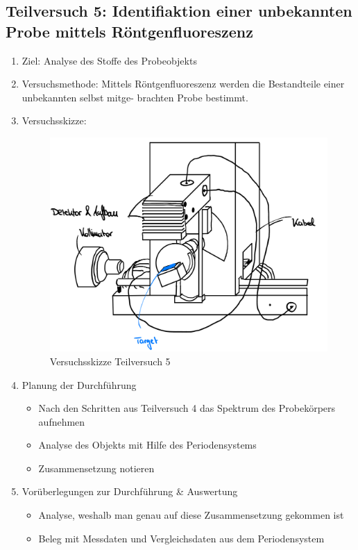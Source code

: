 \documentclass{article}
\begin{document}
\newpage


\subsection{Teilversuch 5: Identifiaktion einer unbekannten Probe mittels Röntgenfluoreszenz}
\begin{enumerate}[label = (\Roman*)]
    \item Ziel: Analyse des Stoffe des Probeobjekts
    
    \item Versuchsmethode: Mittels Röntgenfluoreszenz werden die Bestandteile einer unbekannten selbst mitge- brachten Probe bestimmt.
    
    \item Versuchsskizze:
    
        \begin{figure}[H]
        \centering
        \includegraphics[width=0.7\linewidth]{Abbildungen/Aufbau Fluoreszenz.jpeg}
        \caption{Versuchsskizze Teilversuch 5}
        \end{figure}

    \item Planung der Durchführung
        \begin{itemize}
            \item Nach den Schritten aus Teilversuch 4 das Spektrum des Probekörpers aufnehmen
            \item Analyse des Objekts mit Hilfe des Periodensystems
            \item Zusammensetzung notieren
        \end{itemize}

    \item Vorüberlegungen zur Durchführung \& Auswertung
        \begin{itemize}
            \item Analyse, weshalb man genau auf diese Zusammensetzung gekommen ist
            \item Beleg mit Messdaten und Vergleichsdaten aus dem Periodensystem
        \end{itemize}
    
\end{enumerate}
\end{document}
